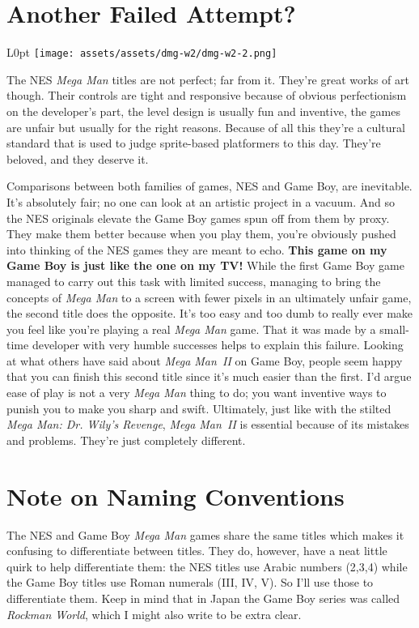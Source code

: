 \documentclass{book}
\begin{document}
\newpage\FloatBarrier\needspace{10mm}\section*{Another Failed Attempt?}\nopagebreak[4]
\begin{wrapfigure}{L}{0pt} \texttt{[image: assets/assets/dmg-w2/dmg-w2-2.png]}\end{wrapfigure}
The NES \emph{Mega Man} titles are not perfect; far from it. They’re great works of art though. Their controls are tight and responsive because of obvious perfectionism on the developer’s part, the level design is usually fun and inventive, the games are unfair but usually for the right reasons. Because of all this they’re a cultural standard that is used to judge sprite-based platformers to this day. They’re beloved, and they deserve it.

Comparisons between both families of games, NES and Game Boy, are inevitable. It’s absolutely fair; no one can look at an artistic project in a vacuum. And so the NES originals elevate the Game Boy games spun off from them by proxy. They make them better because when you play them, you’re obviously pushed into thinking of the NES games they are meant to echo. \textbf{This game on my Game Boy is just like the one on my TV!} While the first Game Boy game managed to carry out this task with limited success, managing to bring the concepts of \emph{Mega Man} to a screen with fewer pixels in an ultimately unfair game, the second title does the opposite. It’s too easy and too dumb to really ever make you feel like you’re playing a real \emph{Mega Man} game. That it was made by a small-time developer with very humble successes helps to explain this failure. Looking at what others have said about \emph{Mega Man II} on Game Boy, people seem happy that you can finish this second title since it’s much easier than the first. I’d argue ease of play is not a very \emph{Mega Man} thing to do; you want inventive ways to punish you to make you sharp and swift. Ultimately, just like with the stilted \emph{Mega Man: Dr. Wily’s Revenge}, \emph{Mega Man II} is essential because of its mistakes and problems. They’re just completely different.

\FloatBarrier\needspace{10mm}\section*{Note on Naming Conventions}\nopagebreak[4]

The NES and Game Boy \emph{Mega Man} games share the same titles which makes it confusing to differentiate between titles. They do, however, have a neat little quirk to help differentiate them: the NES titles use Arabic numbers (2,3,4) while the Game Boy titles use Roman numerals (III, IV, V). So I’ll use those to differentiate them. Keep in mind that in Japan the Game Boy series was called \emph{Rockman World}, which I might also write to be extra clear.
\end{document}
